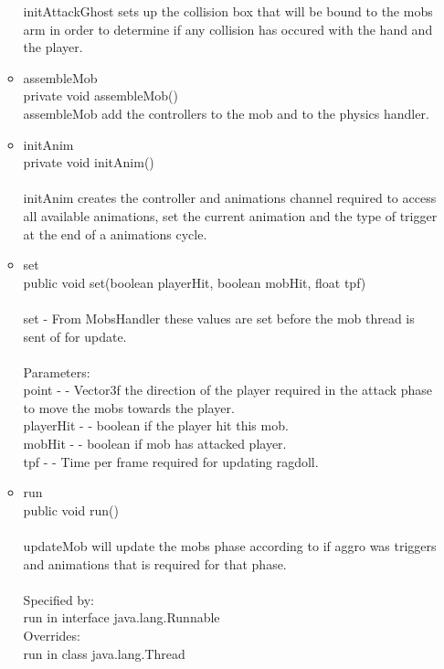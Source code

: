 \documentclass[letterpaper]{article}
\begin{document}
\begin{itemize}
\begin{itemize}
															initAttackGhost sets up the collision box that will be bound to the mobs arm in order to determine if any collision has occured with the hand and the player.
													\item	assembleMob \\
															private void assembleMob() \\
															assembleMob add the controllers to the mob and to the physics handler. \\
													\item	initAnim \\
															private void initAnim() \\ \\
															initAnim creates the controller and animations channel required to access all available animations, set the current animation and the type of trigger at the end of a animations cycle.
													\item	set \\
															public void set(boolean playerHit, boolean mobHit, float tpf) \\ \\
															set - From MobsHandler these values are set before the mob thread is sent of for update. \\ \\
															Parameters: \\
															point - - Vector3f the direction of the player required in the attack phase to move the mobs towards the player. \\
															playerHit - - boolean if the player hit this mob. \\
															mobHit - - boolean if mob has attacked player. \\
															tpf - - Time per frame required for updating ragdoll.
													\item	run \\
															public void run() \\ \\
															updateMob will update the mobs phase according to if aggro was triggers and animations that is required for that phase. \\ \\
															Specified by: \\
															run in interface java.lang.Runnable \\
															Overrides: \\
															run in class java.lang.Thread \\

\end{itemize}
\end{itemize}
\end{document}

